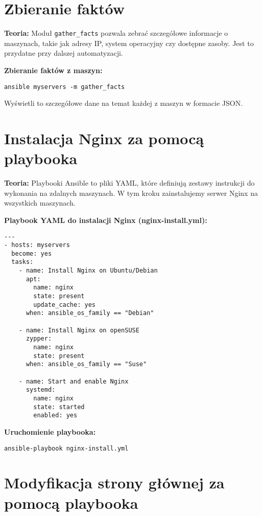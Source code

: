 \documentclass{article}
\begin{document}
\section{Zbieranie faktów}

\textbf{Teoria:}  
Moduł \texttt{gather\_facts} pozwala zebrać szczegółowe informacje o maszynach, takie jak adresy IP, system operacyjny czy dostępne zasoby. Jest to przydatne przy dalszej automatyzacji.

\textbf{Zbieranie faktów z maszyn:}

\noindent\begin{lstlisting}
ansible myservers -m gather_facts
\end{lstlisting}

Wyświetli to szczegółowe dane na temat każdej z maszyn w formacie JSON.

\section{Instalacja Nginx za pomocą playbooka}

\textbf{Teoria:}  
Playbooki Ansible to pliki YAML, które definiują zestawy instrukcji do wykonania na zdalnych maszynach. W tym kroku zainstalujemy serwer Nginx na wszystkich maszynach.

\textbf{Playbook YAML do instalacji Nginx (nginx-install.yml):}

\begin{lstlisting}
---
- hosts: myservers
  become: yes
  tasks:
    - name: Install Nginx on Ubuntu/Debian
      apt:
        name: nginx
        state: present
        update_cache: yes
      when: ansible_os_family == "Debian"
      
    - name: Install Nginx on openSUSE
      zypper:
        name: nginx
        state: present
      when: ansible_os_family == "Suse"
      
    - name: Start and enable Nginx
      systemd:
        name: nginx
        state: started
        enabled: yes
\end{lstlisting}

\textbf{Uruchomienie playbooka:}

\noindent\begin{lstlisting}
ansible-playbook nginx-install.yml
\end{lstlisting}

\section{Modyfikacja strony głównej za pomocą playbooka}
\end{document}
